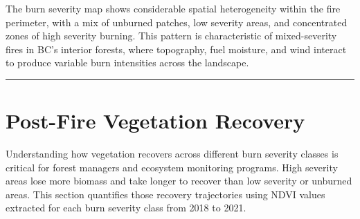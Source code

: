 \documentclass[
]{article}
\begin{document}
The burn severity map shows considerable spatial heterogeneity within
the fire perimeter, with a mix of unburned patches, low severity areas,
and concentrated zones of high severity burning. This pattern is
characteristic of mixed-severity fires in BC's interior forests, where
topography, fuel moisture, and wind interact to produce variable burn
intensities across the landscape.

\begin{center}\rule{0.5\linewidth}{0.5pt}\end{center}

\section{Post-Fire Vegetation
Recovery}\label{post-fire-vegetation-recovery}

Understanding how vegetation recovers across different burn severity
classes is critical for forest managers and ecosystem monitoring
programs. High severity areas lose more biomass and take longer to
recover than low severity or unburned areas. This section quantifies
those recovery trajectories using NDVI values extracted for each burn
severity class from 2018 to 2021.
\end{document}
